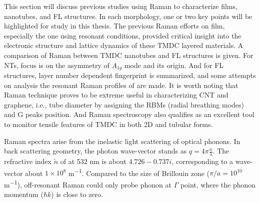 This section will discuss previous studies using Raman to characterize  films, nanotubes, and FL structures. In each morphology, one or two key points will be highlighted for study in this thesis. The previous Raman efforts on  film, especially the one using resonant conditions, provided critical insight into the electronic structure and lattice dynamics of these TMDC layered materials. A comparison of Raman between TMDC nanotubes and FL structures is given. For  NTs, focus is on the asymmetry of $A_{1g}$ mode and its origin. And for  FL structures, layer number dependent fingerprint is summarized, and some attempts on analysis the resonant Raman profiles of  are made. It is worth noting that Raman technique proves to be extreme useful in characterizing CNT and graphene, i.e., tube diameter by assigning the RBMs (radial breathing modes) and G peaks position.\cite{Bonaccorso2013} And Raman spectroscopy also qualifies as an excellent tool to monitor tensile features of TMDC in both 2D and tubular forms.\cite{Tang2013} 

Raman spectra arise from the inelastic light scattering of optical phonons. In back scattering geometry, the photon wave-vector stands as $q = 4\pi\frac{n}{\lambda}$. The refractive index $\tilde{n}$ of  at 532 nm is about $4.726 - 0.737i$, corresponding to a wave-vector about $1\times10^8$ \si{m^{-1}}. Compared to the size of Brillouin zone ($\pi/a = 10^{10}$ \si{m^{-1}}), off-resonant Raman could only probe phonon at $\Gamma$ point, where the phonon momentum ($\hbar k$) is close to zero. 

